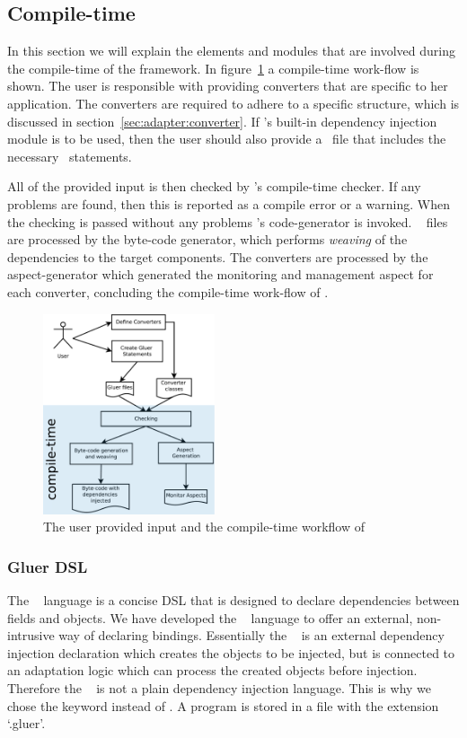 \subsection{Compile-time}
\label{sec:adapter:compile}

In this section we will explain the elements and modules that are involved during the compile-time of the framework. In figure~\ref{fig:ctwf} a compile-time work-flow is shown. The user is responsible with providing converters that are specific to her application. The converters are required to adhere to a specific structure, which is discussed in section~\ref{sec:adapter:converter}. 
If \zamk's built-in dependency injection module is to be used, then the user should also provide a \gluer~file that includes the necessary \gluer~statements. 

All of the provided input is then checked by \zamk's compile-time checker. If any problems are found, then this is reported as a compile error or a warning. When the checking is passed without any problems \zamk's code-generator is invoked. \gluer~ files are processed by the byte-code generator, which performs \emph{weaving} of the dependencies to the target components. The converters are processed by the aspect-generator which generated the monitoring and management aspect for each converter, concluding the compile-time work-flow of \zamk.
\begin{figure}
\centering
\includegraphics[width=0.45\textwidth]{chapteradapters/ctv.pdf}
\caption{The user provided input and the compile-time workflow of \zamk}
\label{fig:ctwf}
\end{figure}

\subsubsection{Gluer DSL}
\label{sec:adapter:gluer}
The \gluer~ language is a concise DSL that is designed to declare dependencies between fields and objects. 
We have developed the \gluer~ language to offer an external, non-intrusive way of declaring bindings. 
Essentially the \gluer~ is an external dependency injection declaration which creates the objects to be injected, but is connected to an adaptation logic which can process the created objects before injection.
Therefore the \gluer~ is not a plain dependency injection language. 
This is why we chose the keyword  instead of . 
A \gluer program is stored in a file with the extension `.gluer'.

